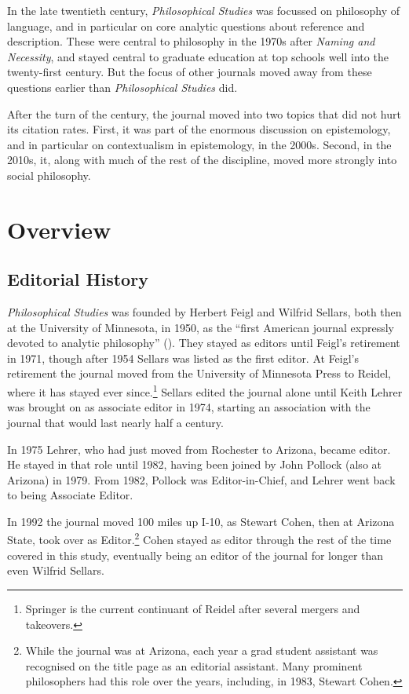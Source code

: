\documentclass[
  10pt,
  letterpaper,
  DIV=11,
  numbers=noendperiod,
  twoside]{scrartcl}
\begin{document}
In the late twentieth century, \emph{Philosophical Studies} was focussed
on philosophy of language, and in particular on core analytic questions
about reference and description. These were central to philosophy in the
1970s after \emph{Naming and Necessity}, and stayed central to graduate
education at top schools well into the twenty-first century. But the
focus of other journals moved away from these questions earlier than
\emph{Philosophical Studies} did.

After the turn of the century, the journal moved into two topics that
did not hurt its citation rates. First, it was part of the enormous
discussion on epistemology, and in particular on contextualism in
epistemology, in the 2000s. Second, in the 2010s, it, along with much of
the rest of the discipline, moved more strongly into social philosophy.

\section{Overview}\label{sec-overview}

\subsection{Editorial History}\label{editorial-history}

\emph{Philosophical Studies} was founded by Herbert Feigl and Wilfrid
Sellars, both then at the University of Minnesota, in 1950, as the
``first American journal expressly devoted to analytic philosophy''
(). They stayed as editors
until Feigl's retirement in 1971, though after 1954 Sellars was listed
as the first editor. At Feigl's retirement the journal moved from the
University of Minnesota Press to Reidel, where it has stayed ever
since.\footnote{Springer is the current continuant of Reidel after
  several mergers and takeovers.} Sellars edited the journal alone until
Keith Lehrer was brought on as associate editor in 1974, starting an
association with the journal that would last nearly half a century.

In 1975 Lehrer, who had just moved from Rochester to Arizona, became
editor. He stayed in that role until 1982, having been joined by John
Pollock (also at Arizona) in 1979. From 1982, Pollock was
Editor-in-Chief, and Lehrer went back to being Associate Editor.

In 1992 the journal moved 100 miles up I-10, as Stewart Cohen, then at
Arizona State, took over as Editor.\footnote{While the journal was at
  Arizona, each year a grad student assistant was recognised on the
  title page as an editorial assistant. Many prominent philosophers had
  this role over the years, including, in 1983, Stewart Cohen.} Cohen
stayed as editor through the rest of the time covered in this study,
eventually being an editor of the journal for longer than even Wilfrid
Sellars.
\end{document}
